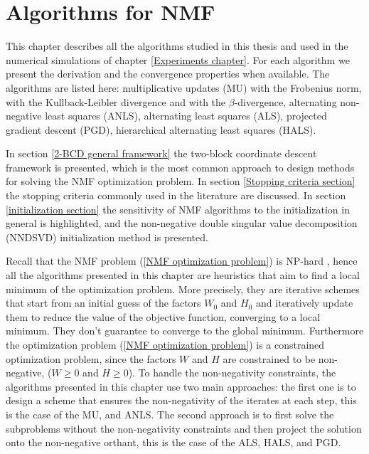 \chapter{Algorithms for NMF}\label{ALGO CHAPTER}
This chapter describes all the algorithms studied in this thesis and used in the numerical simulations of chapter \ref{Experiments chapter}. For each algorithm we present the derivation and the convergence properties when available.
The algorithms are listed here: multiplicative updates (MU) with the Frobenius norm, with the Kullback-Leibler divergence and with the $\beta$-divergence, alternating non-negative least squares (ANLS), alternating least squares (ALS), projected gradient descent (PGD), hierarchical alternating least squares (HALS).
\par
In section \ref{2-BCD general framework} the two-block coordinate descent framework is presented, which is the most common approach to design methods for solving the NMF optimization problem.
In section \ref{Stopping criteria section} the stopping criteria commonly used in the literature are discussed.
In section \ref{initialization section} the sensitivity of NMF algorithms to the initialization in general is highlighted, and the non-negative double singular value decomposition (NNDSVD) initialization method is presented.
\par
Recall that the NMF problem (\ref{NMF optimization problem}) is NP-hard \cite{vavasis2007complexitynonnegativematrixfactorization}, hence all the algorithms presented in this chapter are heuristics that aim to find a local minimum of the optimization problem.
More precisely, they are iterative schemes that start from an initial guess of the factors \( W_0 \) and \( H_0 \) and iteratively update them to reduce the value of the objective function, converging to a local minimum.
They don't guarantee to converge to the global minimum.
Furthermore the optimization problem (\ref{NMF optimization problem}) is a constrained optimization problem, since the factors \( W \) and \( H \) are constrained to be non-negative, (\( W \geq 0 \) and \( H \geq 0 \)).
To handle the non-negativity constraints, the algorithms presented in this chapter use two main approaches: the first one is to design a scheme that ensures the non-negativity of the iterates at each step, this is the case of the MU, and ANLS.
The second approach is to first solve the subproblems without the non-negativity constraints and then project the solution onto the non-negative orthant, this is the case of the ALS, HALS, and PGD.



